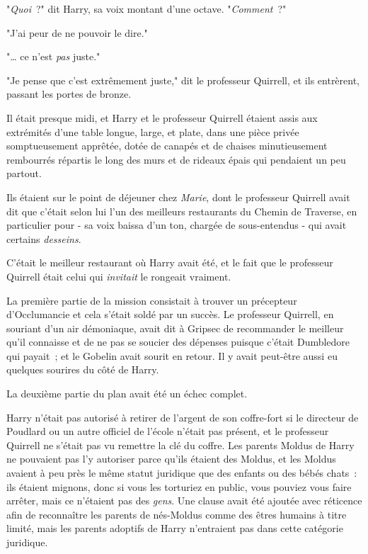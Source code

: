 "\emph{Quoi}~?" dit Harry, sa voix montant d'une octave. "\emph{Comment}~?"

"J'ai peur de ne pouvoir le dire."

"… ce n'est \emph{pas} juste."

"Je pense que c'est extrêmement juste," dit le professeur Quirrell, et ils entrèrent, passant les portes de bronze.

\later

Il était presque midi, et Harry et le professeur Quirrell étaient assis aux extrémités d'une table longue, large, et plate, dans une pièce privée somptueusement apprêtée, dotée de canapés et de chaises minutieusement rembourrés répartis le long des murs et de rideaux épais qui pendaient un peu partout.

Ils étaient sur le point de déjeuner chez \emph{Marie}, dont le professeur Quirrell avait dit que c'était selon lui l'un des meilleurs restaurants du Chemin de Traverse, en particulier pour - sa voix baissa d'un ton, chargée de sous-entendus - qui avait certains \emph{desseins}.

C'était le meilleur restaurant où Harry avait été, et le fait que le professeur Quirrell était celui qui \emph{invitait} le rongeait vraiment.

La première partie de la mission consistait à trouver un précepteur d'Occlumancie et cela s'était soldé par un succès. Le professeur Quirrell, en souriant d'un air démoniaque, avait dit à Gripsec de recommander le meilleur qu'il connaisse et de ne pas se soucier des dépenses puisque c'était Dumbledore qui payait~; et le Gobelin avait sourit en retour. Il y avait peut-être aussi eu quelques sourires du côté de Harry.

La deuxième partie du plan avait été un échec complet.

Harry n'était pas autorisé à retirer de l'argent de son coffre-fort si le directeur de Poudlard ou un autre officiel de l'école n'était pas présent, et le professeur Quirrell ne s'était pas vu remettre la clé du coffre. Les parents Moldus de Harry ne pouvaient pas l'y autoriser parce qu'ils étaient des Moldus, et les Moldus avaient à peu près le même statut juridique que des enfants ou des bébés chats~: ils étaient mignons, donc si vous les torturiez en public, vous pouviez vous faire arrêter, mais ce n'étaient pas des \emph{gens}. Une clause avait été ajoutée avec réticence afin de reconnaître les parents de nés-Moldus comme des êtres humains à titre limité, mais les parents adoptifs de Harry n'entraient pas dans cette catégorie juridique.

